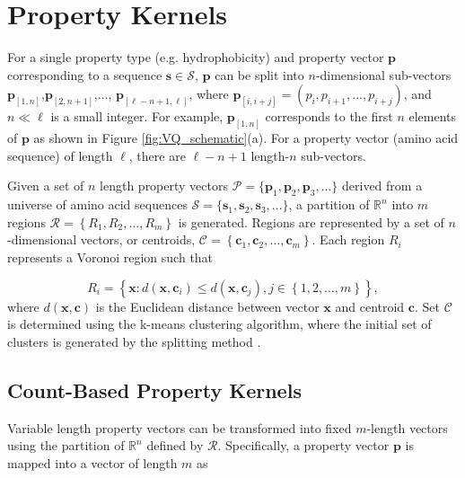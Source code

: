 \section{Property Kernels}

For a single property type (e.g. hydrophobicity) and property vector $\mathbf{p}$ corresponding to a sequence $\mathbf{s}\in\mathcal{S}$, $\mathbf{p}$ can be split into $n$-dimensional sub-vectors $\mathbf{p}_{[1,n]}$,$\mathbf{p}_{[2,n+1]}$,$\ldots$, $\mathbf{p}_{[\ell-n+1,\ell]}$, where $\mathbf{p}_{[i,i+j]}=(p_{i},p_{i+1},...,p_{i+j})$, and $n\ll\ell$ is a small integer. For example, $\mathbf{p}_{[1,n]}$ corresponds to the first $n$ elements of $\mathbf{p}$ as shown in Figure \ref{fig:VQ_schematic}(a). For a property vector (amino acid sequence) of length $\ell$, there are $\ell-n+1$ length-$n$ sub-vectors.

Given a set of $n$ length property vectors $\mathcal{P}=\{\mathbf{p}_{1},\mathbf{p}_{2},\mathbf{p}_{3},...\}$ derived from a universe of amino acid sequences $\mathcal{S}=\{\mathbf{s}_{1},\mathbf{s}_{2},\mathbf{s}_{3},...\}$, a partition of $\mathbb{R}^{n}$ into $m$ regions $\mathcal{R}=\left\{ R_{1},R_{2},\ldots,R_{m}\right\} $ is generated. Regions are represented by a set of $n$-dimensional vectors, or centroids, $\mathcal{C}=\left\{ \mathbf{c}_{1},\mathbf{c}_{2},\ldots,\mathbf{c}_{m}\right\} $. Each region $R_{i}$ represents a Voronoi region such that 

\[
R_{i}=\left\{ \mathbf{x}:d(\mathbf{x},\mathbf{c}_{i})\leq d(\mathbf{x},\mathbf{c}_{j}),j\in\left\{ 1,2,\ldots,m\right\} \right\} ,
\]
where $d(\mathbf{x},\mathbf{c})$ is the Euclidean distance between vector $\mathbf{x}$ and centroid $\mathbf{c}$. Set $\mathcal{C}$ is determined using the k-means clustering algorithm, where the initial set of clusters is generated by the splitting method \citep{gersho1992vector}.


\subsection{Count-Based Property Kernels}
\label{sec:propertykernels}

Variable length property vectors can be transformed into fixed $m$-length vectors using the partition of $\mathbb{R}^{n}$ defined by $\mathcal{R}$. Specifically, a property vector $\mathbf{p}$ is mapped into a vector of length $m$ as 

